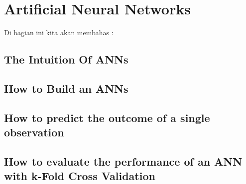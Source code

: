 \section{Artificial Neural Networks}
Di bagian ini kita akan membahas :

\subsection{The Intuition Of ANNs}
\subsection{How to Build an ANNs}
\subsection{How to predict the outcome of a single observation}
\subsection{How to evaluate the performance of an ANN with k-Fold Cross Validation}
